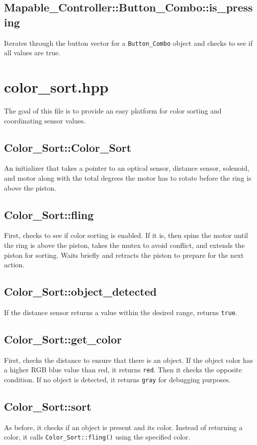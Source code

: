 \subsection*{Mapable\_Controller::Button\_Combo::is\_pressing}
Iterates through the button vector for a \texttt{Button\_Combo} object and checks to see if all values are true.

\section*{color\_sort.hpp}
The goal of this file is to provide an easy platform for color sorting and coordinating sensor values.

\subsection*{Color\_Sort::Color\_Sort}
An initializer that takes a pointer to an optical sensor, distance sensor, solenoid, and motor along with the total degrees the motor has to rotate before the ring is above the piston.

\subsection*{Color\_Sort::fling}
First, checks to see if color sorting is enabled. If it is, then spins the motor until the ring is above the piston, takes the mutex to avoid conflict, and extends the piston for sorting. Waits briefly and retracts the piston to prepare for the next action.

\subsection*{Color\_Sort::object\_detected}
If the distance sensor returns a value within the desired range, returns \texttt{true}.

\subsection*{Color\_Sort::get\_color}
First, checks the distance to ensure that there is an object. If the object color has a higher RGB blue value than red, it returns \texttt{red}. Then it checks the opposite condition. If no object is detected, it returns \texttt{gray} for debugging purposes.

\subsection*{Color\_Sort::sort}
As before, it checks if an object is present and its color. Instead of returning a color, it calls \texttt{Color\_Sort::fling()} using the specified color.

